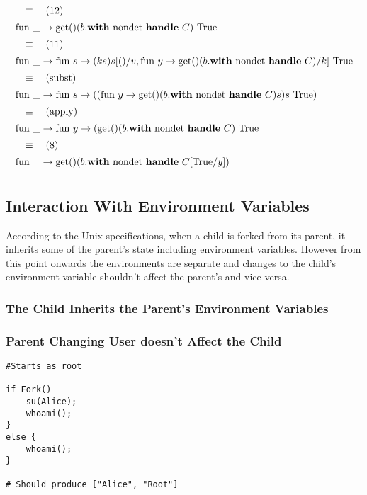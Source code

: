\documentclass[logo,bsc,singlespacing,parskip]{infthesis}
\begin{document}
\[\begin{array}{l}
\quad\equiv\quad (12) \\[5pt]
\text{fun } \_ \rightarrow \text{get()}(b. \text{\textbf{with} nondet \textbf{handle} } C) \text{ True} \\[5pt]
\quad\equiv\quad (11) \\[5pt]
\text{fun } \_ \rightarrow \text{fun } s \rightarrow (k s) s [ ()/v, \text{fun } y \rightarrow \text{get()}(b.\text{\textbf{with} nondet \textbf{handle} } C)/k] \text{ True} \\[5pt]
\quad\equiv\quad (\text{subst}) \\[5pt]
\text{fun } \_ \rightarrow \text{fun } s \rightarrow ((\text{fun } y \rightarrow \text{get()}(b.\text{\textbf{with} nondet \textbf{handle} } C) s) s \text{ True}) \\[5pt]
\quad\equiv\quad (\text{apply}) \\[5pt]
\text{fun } \_ \rightarrow \text{fun } y \rightarrow ( \text{get()}(b.\text{\textbf{with} nondet \textbf{handle} } C )\text{ True} \\[5pt]
\quad\equiv\quad (8) \\[5pt]
\text{fun } \_ \rightarrow \text{get()}(b.\text{\textbf{with} nondet \textbf{handle} } C[\text{True}/y]) \\[5pt]
\end{array}
\]








\subsection*{Interaction With Environment Variables}
According to the Unix specifications, when a child is forked from its parent, it inherits some of the parent's state including environment variables. However from this point onwards the environments are separate and changes to the child's environment variable shouldn't affect the parent's and vice versa.



\subsubsection*{The Child Inherits the Parent's Environment Variables}

\subsubsection*{Parent Changing User doesn't Affect the Child}
\begin{lstlisting}
#Starts as root

if Fork()
    su(Alice);
    whoami();
}
else {
    whoami();
}

# Should produce ["Alice", "Root"]
\end{lstlisting}
\end{document}
